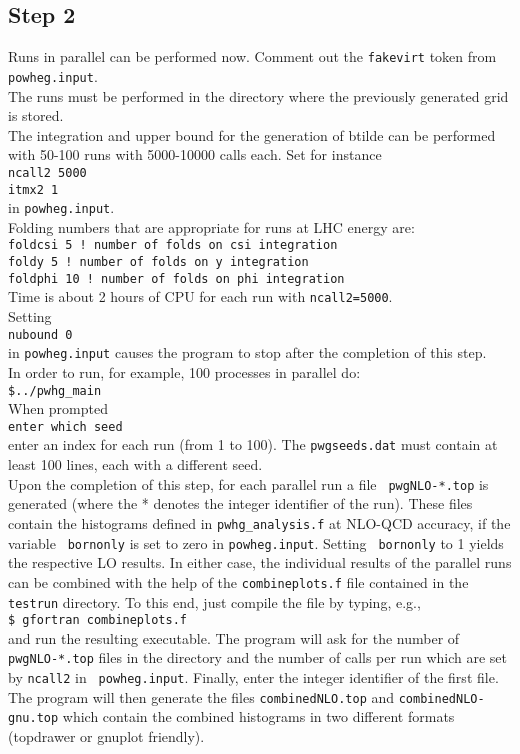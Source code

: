 \documentclass[a4paper,11pt]{article}
\begin{document}
\subsection*{Step 2}
%
Runs in parallel can be performed now. Comment out the {\tt fakevirt}
token from {\tt powheg.input}.
\\[2ex]
The runs must be performed in the directory where the previously generated grid is stored.
\\[2ex]
The integration and upper bound for the generation of btilde can be
performed with 50-100 runs with 5000-10000 calls each. Set for
instance
\\[2ex]
{\tt ncall2 5000}
\\[2ex]
{\tt itmx2 1}
\\[2ex]
in {\tt powheg.input}.
\\[2ex]
Folding numbers that are appropriate for runs at LHC energy are:
\\[2ex]
{\tt foldcsi 5 ! number of folds on csi integration}
\\[2ex]
{\tt foldy 5 ! number of folds on y integration}
\\[2ex]
{\tt foldphi 10 ! number of folds on phi integration}
\\[2ex]
Time is about 2 hours of CPU for each run with {\tt ncall2=5000}.
\\[2ex]
Setting
\\[2ex]
{\tt nubound 0}
\\[2ex]
in {\tt powheg.input} causes the program to stop after the completion
of this step.
\\[2ex]
In order to run, for example, 100 processes in parallel do:
\\[2ex]
{\tt \$../pwhg\_main}
\\[2ex]
When prompted
\\[2ex]
{\tt enter which seed}
\\[2ex]
enter an index for each run (from 1 to 100). The {\tt pwgseeds.dat}
must contain at least 100 lines, each with a different seed.
\\[2ex]
Upon the completion of this step, for each parallel run a file {\tt
  pwgNLO-*.top} is generated (where the * denotes the integer
identifier of the run).  These files contain the histograms defined in
{\tt pwhg\_analysis.f} at NLO-QCD accuracy, if the variable {\tt
  bornonly} is set to zero in {\tt powheg.input}.  Setting {\tt
  bornonly} to 1 yields the respective LO results. In either case, the
individual results of the parallel runs can be combined with the help
of the {\tt combineplots.f} file contained in the {\tt testrun}
directory.  To this end, just compile the file by typing, e.g.,
\\[2ex]
{\tt \$ gfortran combineplots.f}
\\[2ex]
and run the resulting executable. The program will ask for the 
number of {\tt pwgNLO-*.top} files in the directory and the number
of calls per run which are set by {\tt ncall2} in {\tt
  powheg.input}. Finally, enter the integer identifier of the first
file. The program will then generate the files {\tt combinedNLO.top}
and {\tt combinedNLO-gnu.top} which contain the combined histograms
in two different formats (topdrawer or gnuplot friendly). 
\end{document}
